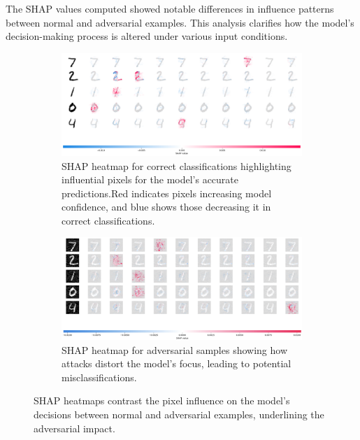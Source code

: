 \documentclass[10pt, conference, a4paper, final]{IEEEtran}
\begin{document}
The SHAP values computed showed notable differences in influence patterns between normal and adversarial examples. This analysis clarifies how the model's decision-making process is altered under various input conditions.

\begin{figure}[h]
    \centering
    \begin{subfigure}{\columnwidth}
        \centering
        \includegraphics[width=\linewidth]{paper_images/correctshap.png}
        \caption{SHAP heatmap for correct classifications highlighting influential pixels for the model's accurate predictions.Red indicates pixels increasing model confidence, and blue shows those decreasing it in correct classifications.}
        \label{fig:correct_shap}
    \end{subfigure}
    \par\medskip %
    \begin{subfigure}{\columnwidth}
        \centering
        \includegraphics[width=\linewidth]{paper_images/adversarial.png}
        \caption{SHAP heatmap for adversarial samples showing how attacks distort the model's focus, leading to potential misclassifications.}
        \label{fig:adversarial}
    \end{subfigure}
    \caption{SHAP heatmaps contrast the pixel influence on the model's decisions between normal and adversarial examples, underlining the adversarial impact.}
    \label{fig:both_shap_figures}
\end{figure}
\end{document}

